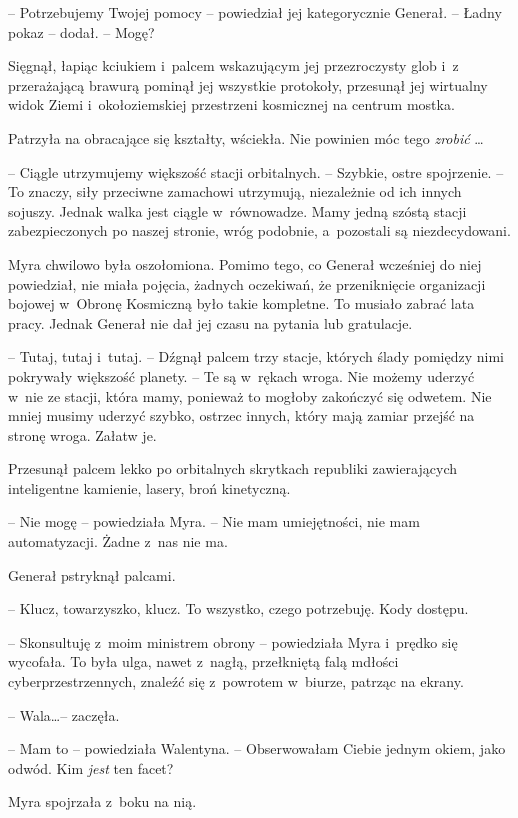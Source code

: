 \documentclass[oneside,polish,11pt,sfheadings]{mwbk}
\begin{document}
-- Potrzebujemy Twojej pomocy -- powiedział jej kategorycznie Generał. -- Ładny pokaz -- dodał. -- Mogę?

Sięgnął, łapiąc kciukiem i~palcem wskazującym jej przezroczysty glob i~z przerażającą brawurą pominął jej wszystkie protokoły, przesunął jej
wirtualny widok Ziemi i~okołoziemskiej przestrzeni kosmicznej na centrum
mostka.

Patrzyła na obracające się kształty, wściekła. Nie powinien móc tego
\textit{zrobić} \ldots

-- Ciągle utrzymujemy większość stacji orbitalnych. -- Szybkie, ostre
spojrzenie. -- To znaczy, siły przeciwne zamachowi utrzymują, niezależnie
od ich innych sojuszy. Jednak walka jest ciągle w~równowadze. Mamy jedną
szóstą stacji zabezpieczonych po naszej stronie, wróg podobnie, a~pozostali są niezdecydowani.

Myra chwilowo była oszołomiona. Pomimo tego, co Generał wcześniej do
niej powiedział, nie miała pojęcia, żadnych oczekiwań, że przeniknięcie
organizacji bojowej w~Obronę Kosmiczną było takie kompletne. To musiało
zabrać lata pracy. Jednak Generał nie dał jej czasu na pytania lub
gratulacje.

-- Tutaj, tutaj i~tutaj. -- Dźgnął palcem trzy stacje, których ślady
pomiędzy nimi pokrywały większość planety. -- Te są w~rękach wroga. Nie
możemy uderzyć w~nie ze stacji, która mamy, ponieważ to mogłoby
zakończyć się odwetem. Nie mniej musimy uderzyć szybko, ostrzec innych,
który mają zamiar przejść na stronę wroga. Załatw je.

Przesunął palcem lekko po orbitalnych skrytkach republiki zawierających
inteligentne kamienie, lasery, broń kinetyczną.

-- Nie mogę -- powiedziała Myra. -- Nie mam umiejętności, nie mam
automatyzacji. Żadne z~nas nie ma.

Generał pstryknął palcami. 

-- Klucz, towarzyszko, klucz. To wszystko,
czego potrzebuję. Kody dostępu.

-- Skonsultuję z~moim ministrem obrony -- powiedziała Myra i~prędko się
wycofała. To była ulga, nawet z~nagłą, przełkniętą falą mdłości
cyberprzestrzennych, znaleźć się z~powrotem w~biurze,
patrząc na ekrany.

-- Wala\ldots -- zaczęła.

-- Mam to -- powiedziała Walentyna. -- Obserwowałam Ciebie jednym okiem,
jako odwód. Kim \textit{jest }ten facet?

Myra spojrzała z~boku na nią. 
\end{document}
